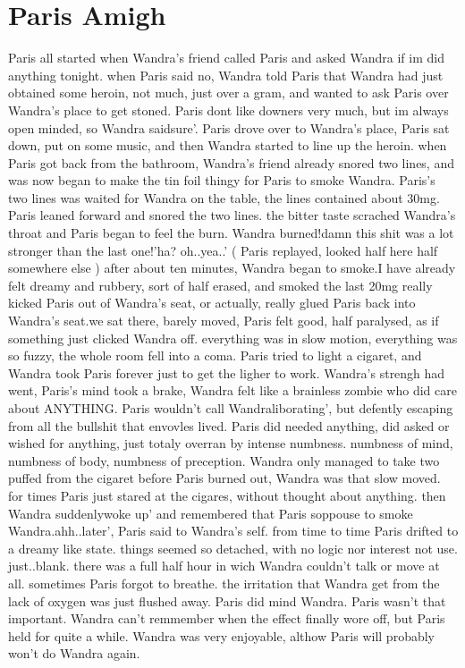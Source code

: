 \documentclass[12pt]{book}
\begin{document}
\chapter{Paris Amigh}

Paris all started when Wandra's friend called Paris and asked Wandra if im did anything tonight. when Paris said no, Wandra told Paris that Wandra had just obtained some heroin, not much, just over a gram, and wanted to ask Paris over Wandra's place to get stoned. Paris dont like downers very much, but im always open minded, so Wandra saidsure'. Paris drove over to Wandra's place, Paris sat down, put on some music, and then Wandra started to line up the heroin. when Paris got back from the bathroom, Wandra's friend already snored two lines, and was now began to make the tin foil thingy for Paris to smoke Wandra. Paris's two lines was waited for Wandra on the table, the lines contained about 30mg. Paris leaned forward and snored the two lines. the bitter taste scrached Wandra's throat and Paris began to feel the burn. Wandra burned!damn this shit was a lot stronger than the last one!'ha? oh..yea..' ( Paris replayed, looked half here half somewhere else ) after about ten minutes, Wandra began to smoke.I have already felt dreamy and rubbery, sort of half erased, and smoked the last 20mg really kicked Paris out of Wandra's seat, or actually, really glued Paris back into Wandra's seat.we sat there, barely moved, Paris felt good, half paralysed, as if something just clicked Wandra off. everything was in slow motion, everything was so fuzzy, the whole room fell into a coma. Paris tried to light a cigaret, and Wandra took Paris forever just to get the ligher to work. Wandra's strengh had went, Paris's mind took a brake, Wandra felt like a brainless zombie who did care about ANYTHING. Paris wouldn't call Wandraliborating', but defently escaping from all the bullshit that envovles lived. Paris did needed anything, did asked or wished for anything, just totaly overran by intense numbness. numbness of mind, numbness of body, numbness of preception. Wandra only managed to take two puffed from the cigaret before Paris burned out, Wandra was that slow moved. for times Paris just stared at the cigares, without thought about anything. then Wandra suddenlywoke up' and remembered that Paris soppouse to smoke Wandra.ahh..later', Paris said to Wandra's self. from time to time Paris drifted to a dreamy like state. things seemed so detached, with no logic nor interest not use. just..blank. there was a full half hour in wich Wandra couldn't talk or move at all. sometimes Paris forgot to breathe. the irritation that Wandra get from the lack of oxygen was just flushed away. Paris did mind Wandra. Paris wasn't that important. Wandra can't remmember when the effect finally wore off, but Paris held for quite a while. Wandra was very enjoyable, althow Paris will probably won't do Wandra again.
\end{document}
